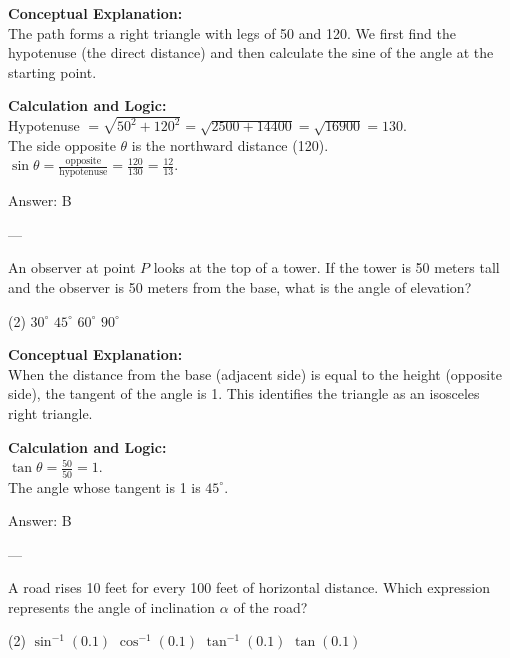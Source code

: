 \documentclass[11pt,paper=a4,answers]{exam}
\begin{document}
\begin{questions}
\begin{solution}
\textbf{Conceptual Explanation:} \\
The path forms a right triangle with legs of 50 and 120. We first find the hypotenuse (the direct distance) and then calculate the sine of the angle at the starting point.

\vspace{10pt}
\textbf{Calculation and Logic:} \\
Hypotenuse $= \sqrt{50^2 + 120^2} = \sqrt{2500 + 14400} = \sqrt{16900} = 130$. \\
The side opposite $\theta$ is the northward distance (120). \\
$\sin \theta = \frac{\text{opposite}}{\text{hypotenuse}} = \frac{120}{130} = \frac{12}{13}$.

\vspace{15pt}
Answer: \colorbox{yellow!100}{B}
\end{solution}

---

\question
An observer at point $P$ looks at the top of a tower. If the tower is 50 meters tall and the observer is 50 meters from the base, what is the angle of elevation?
\begin{tasks}(2)
    \task $30^\circ$
    \task $45^\circ$
    \task $60^\circ$
    \task $90^\circ$
\end{tasks}

\begin{solution}
\textbf{Conceptual Explanation:} \\
When the distance from the base (adjacent side) is equal to the height (opposite side), the tangent of the angle is 1. This identifies the triangle as an isosceles right triangle.

\vspace{10pt}
\textbf{Calculation and Logic:} \\
$\tan \theta = \frac{50}{50} = 1$. \\
The angle whose tangent is 1 is $45^\circ$.

\vspace{15pt}
Answer: \colorbox{yellow!100}{B}
\end{solution}

---

\question
A road rises 10 feet for every 100 feet of horizontal distance. Which expression represents the angle of inclination $\alpha$ of the road?
\begin{tasks}(2)
    \task $\sin^{-1}(0.1)$
    \task $\cos^{-1}(0.1)$
    \task $\tan^{-1}(0.1)$
    \task $\tan(0.1)$
\end{tasks}


\end{questions}
\end{document}
